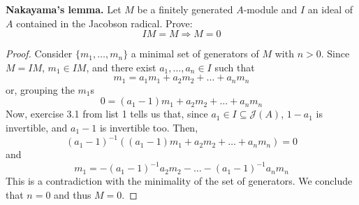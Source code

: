\begin{problem}
    \textbf{Nakayama's lemma.} Let $M$ be a finitely generated $A$-module and $I$ an ideal of $A$ contained in the
    Jacobson radical.
    Prove:
    \[
        IM = M \Rightarrow M = 0
    \]
    \begin{sol}
        \begin{proof}
            Consider $\{m_1, \dots, m_n\}$ a minimal set of generators of $M$ with $n > 0$.
            Since $M = IM$, $m_1 \in IM$, and there exist $a_1, \dots, a_n \in I$ such that
            \[
                m_1 = a_1 m_1 + a_2 m_2 + \dots + a_n m_n
            \]
            or, grouping the $m_1$s
            \[
                0 = (a_1 - 1) m_1 + a_2 m_2 + \dots + a_n m_n
            \]
            Now, exercise 3.1 from list 1 tells us that, since $a_1 \in I \subseteq \mathcal{J}(A)$, $1 - a_1$ is
            invertible, and $a_1 - 1$ is invertible too.
            Then,
            \[
                (a_1 - 1)^{-1}((a_1 - 1) m_1 + a_2 m_2 + \dots + a_n m_n) = 0
            \]
            and
            \[
                m_1 = -(a_1 - 1)^{-1} a_2 m_2 - \dots - (a_1 - 1)^{-1} a_n m_n
            \]
            This is a contradiction with the minimality of the set of generators.
            We conclude that $n = 0$ and thus $M = 0$.
        \end{proof}
    \end{sol}
\end{problem}